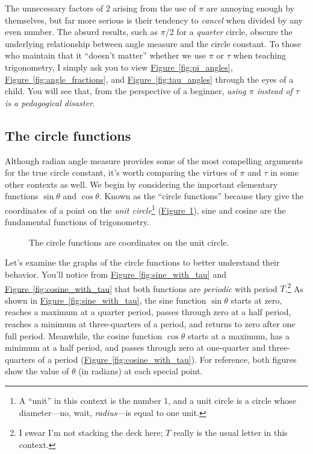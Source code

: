 \documentclass{article}
\begin{document}

The unnecessary factors of $2$ arising from the use of $\pi$ are annoying enough by themselves, but far more serious is their tendency to \emph{cancel} when divided by any even number. The absurd results, such as $\pi$/2 for a \emph{quarter} circle, obscure the underlying relationship between angle measure and the circle constant. To those who maintain that it ``doesn't matter'' whether we use $\pi$ or $\tau$ when teaching trigonometry, I simply ask you to view \hyperref[fig:pi_angles]{Figure~}\ref{fig:pi_angles}, \hyperref[fig:angle_fractions]{Figure~}\ref{fig:angle_fractions}, and \hyperref[fig:tau_angles]{Figure~}\ref{fig:tau_angles} through the eyes of a child. You will see that, from the perspective of a beginner, \emph{using $\pi$ instead of $\tau$ is a pedagogical disaster.}

  \subsection{The circle functions} %
  \label{sec:the_circle_functions}

Although radian angle measure provides some of the most compelling arguments for the true circle constant, it's worth comparing the virtues of $\pi$ and $\tau$ in some other contexts as well. We begin by considering the important elementary functions $\sin\theta$ and $\cos\theta$. Known as the ``circle functions''  because they give the coordinates of a point on the \emph{unit circle}\footnote{A ``unit'' in this context is the number 1, and a unit circle is a circle whose diameter---no, wait, \emph{radius}---is equal to one unit.} (\hyperref[fig:circle_functions]{Figure~}\ref{fig:circle_functions}), sine and cosine are the fundamental functions of trigonometry.

\begin{figure}
\begin{center}
\end{center}
\caption{The circle functions are coordinates on the unit circle.\label{fig:circle_functions}}
\end{figure}

Let's examine the graphs of the circle functions to better understand their behavior. You'll notice from \hyperref[fig:sine_with_tau]{Figure~}\ref{fig:sine_with_tau} and \hyperref[fig:cosine_with_tau]{Figure~}\ref{fig:cosine_with_tau} that both functions are \emph{periodic} with period $T$.\footnote{I swear I'm not stacking the deck here; $T$ really is the usual letter in this context.} As shown in \hyperref[fig:sine_with_tau]{Figure~}\ref{fig:sine_with_tau}, the sine function $\sin\theta$ starts at zero, reaches a maximum at a quarter period, passes through zero at a half period, reaches a minimum at three-quarters of a period, and returns to zero after one full period. Meanwhile, the cosine function $\cos\theta$ starts at a maximum, has a minimum at a half period, and passes through zero at one-quarter and three-quarters of a period  (\hyperref[fig:cosine_with_tau]{Figure~}\ref{fig:cosine_with_tau}). For reference, both figures show the value of $\theta$ (in radians) at each special point.
\end{document}

